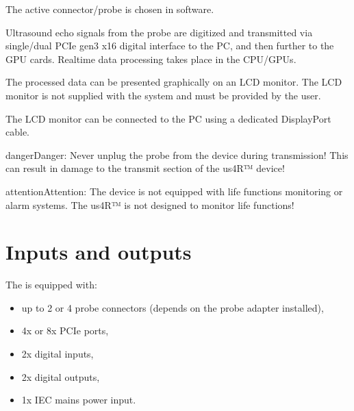 \documentclass[letterpaper,10pt,english]{sphinxmanual}
\begin{document}
\sphinxAtStartPar
The active connector/probe is chosen in software.

\sphinxAtStartPar
Ultrasound echo signals from the probe are digitized and transmitted via single/dual PCIe gen3 x16 digital interface to the PC, and then further to the GPU cards. Real\sphinxhyphen{}time data processing takes place in the CPU/GPUs.

\sphinxAtStartPar
The processed data can be presented graphically on an LCD monitor. The LCD monitor is not supplied with the  system and must be provided by the user.

\sphinxAtStartPar
The LCD monitor can be connected to the PC using a dedicated DisplayPort cable.

\begin{sphinxadmonition}{danger}{Danger:}
\sphinxAtStartPar
Never unplug the probe from the device during transmission!
This can result in damage to the transmit section of the us4R™ device!
\end{sphinxadmonition}

\begin{sphinxadmonition}{attention}{Attention:}
\sphinxAtStartPar
The device is not equipped with life functions monitoring or alarm systems.
The us4R™ is not designed to monitor life functions!
\end{sphinxadmonition}


\section{Inputs and outputs}
\label{\detokenize{content/hardware:inputs-and-outputs}}
\sphinxAtStartPar
The  is equipped with:
\begin{itemize}
\item {} 
\sphinxAtStartPar
up to 2 or 4 probe connectors (depends on the probe adapter
installed),

\item {} 
\sphinxAtStartPar
4x or 8x PCIe ports,

\item {} 
\sphinxAtStartPar
2x digital inputs,

\item {} 
\sphinxAtStartPar
2x digital outputs,

\item {} 
\sphinxAtStartPar
1x IEC mains power input.

\end{itemize}
\end{document}
